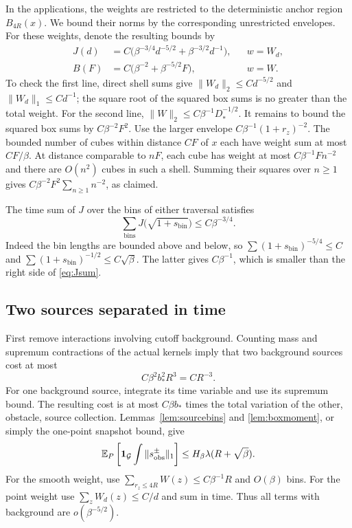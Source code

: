 In the applications, the weights are restricted to the deterministic
anchor region $B_{4R}(x)$.  We bound their norms by the corresponding
unrestricted envelopes.  For these weights, denote the resulting bounds by
\begin{equation}\label{eq:JB}
 \begin{aligned}
 J(d)&=C\bigl(\beta^{-3/4}d^{-5/2}
                         +\beta^{-3/2}d^{-1}\bigr),
       &&w=W_d,\\
 B(F)&=C\bigl(\beta^{-2}+\beta^{-5/2}F\bigr),
       &&w=W.
 \end{aligned}
\end{equation}
To check the first line, direct shell sums give
$\|W_d\|_2\le Cd^{-5/2}$ and $\|W_d\|_1\le Cd^{-1}$;
the square root of the squared box sums is no greater than the
total weight.  For the second line,
$\|W\|_2\le C\beta^{-1}D_*^{-1/2}$.
It remains to bound the squared box sums by $C\beta^{-2}F^2$.
Use the larger envelope $C\beta^{-1}(1+r_z)^{-2}$.
The bounded number of cubes within distance $CF$ of $x$ each have
weight sum at most $CF/\beta$.  At distance comparable to $nF$,
each cube has weight at most $C\beta^{-1}F n^{-2}$ and there are
$O(n^2)$ cubes in such a shell.  Summing their squares over $n\ge1$
gives $C\beta^{-2}F^2\sum_{n\ge1}n^{-2}$, as claimed.

The time sum of $J$ over the bins of either traversal satisfies
\begin{equation}\label{eq:Jsum}
 \sum_{\mathrm{bins}}J\bigl(\sqrt{1+s_{\mathrm{bin}}}\bigr)
                           \le C\beta^{-3/4}.
\end{equation}
Indeed the bin lengths are bounded above and below, so
$\sum(1+s_{\mathrm{bin}})^{-5/4}\le C$ and
$\sum(1+s_{\mathrm{bin}})^{-1/2}\le C\sqrt\beta$.
The latter gives $C\beta^{-1}$, which is smaller than the
right side of \eqref{eq:Jsum}.

\subsection{Two sources separated in time}

First remove interactions involving cutoff background.  Counting
mass and supremum contractions of the actual kernels imply that
two background sources cost at most
\[
 C\beta^2b_*^2R^3=CR^{-3}.
\]
For one background source, integrate its time variable and use its
supremum bound.  The resulting cost is at most $C\beta b_*$ times
the total variation of the other, obstacle, source collection.
Lemmas~\ref{lem:sourcebins} and \ref{lem:boxmoment}, or simply the
one-point snapshot bound, give
\begin{equation}\label{eq:expectedsourcevariation}
 \mathbb E_P\left[\mathbf 1_{\mathcal G}
                \int\|s^{\pm}_{\mathrm{obs}}\|_1\right]
                  \le H_\beta\lambda(R+\sqrt\beta).
\end{equation}
For the smooth weight, use
$\sum_{r_z\le4R}W(z)\le C\beta^{-1}R$ and $O(\beta)$ bins.
For the point weight use $\sum_zW_d(z)\le C/d$ and sum in time.
Thus all terms with background are $o(\beta^{-5/2})$.

